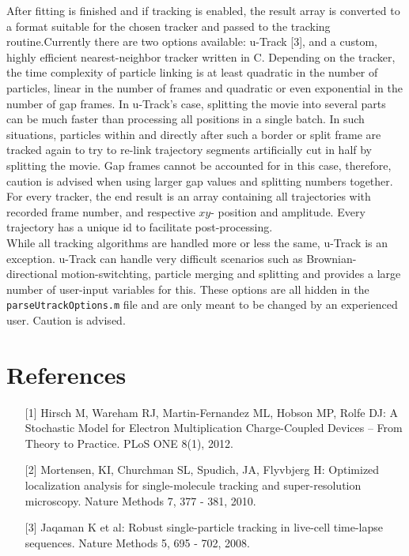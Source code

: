 \documentclass[11pt,onside]{report}
\numberwithin{equation}{chapter}
\def\CC{{C\nolinebreak[4]\hspace{-.05em}\raisebox{.4ex}{\tiny\bf ++}}}
\begin{document}
 After fitting is finished and if tracking is enabled, the result array is converted to a format suitable for the chosen tracker and passed to the tracking routine.Currently there are two options available: u-Track [3], and a custom, highly efficient nearest-neighbor tracker written in \CC. Depending on the tracker, the time complexity of particle linking is at least quadratic in the number of particles, linear in the number of frames and quadratic or even exponential in the number of gap frames. In u-Track's case, splitting the movie into several parts can be much faster than processing all positions in a single batch. In such situations, particles within and directly after such a border or split frame are tracked again to try to re-link trajectory segments artificially cut in half by splitting the movie. Gap frames cannot be accounted for in this case, therefore, caution is advised when using larger gap values and splitting numbers together.\\
For every tracker, the end result is an array containing all trajectories with recorded frame number, and respective $xy$- position and amplitude. Every trajectory has a unique id to facilitate post-processing. \\
While all tracking algorithms are handled more or less the same, u-Track is an exception. u-Track can handle very difficult scenarios such as Brownian-directional motion-switchting, particle merging and splitting and provides a large number of user-input variables for this. These options are all hidden in the \texttt{parseUtrackOptions.m} file and are only meant to be changed by an experienced user. Caution is advised.




\section{References}
\begin{itemize}
\item [{[1]}]  Hirsch M, Wareham RJ, Martin-Fernandez ML, Hobson MP, Rolfe DJ: A Stochastic Model for Electron Multiplication Charge-Coupled Devices – From Theory to Practice. PLoS ONE 8(1), 2012.
\item [{[2]}] Mortensen, KI, Churchman SL, Spudich, JA, Flyvbjerg H: Optimized localization analysis for single-molecule tracking and super-resolution microscopy. Nature Methods 7, 377 - 381, 2010.
\item [{[3]}] Jaqaman K et al: Robust single-particle tracking in live-cell time-lapse sequences. Nature Methods 5, 695 - 702, 2008.

\end{itemize}
\end{document}
